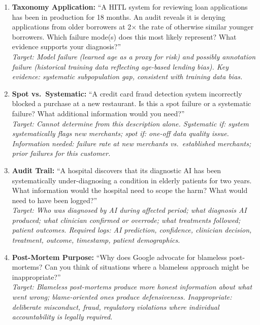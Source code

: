 \begin{enumerate}
    \item \textbf{Taxonomy Application:} ``A HITL system for reviewing loan applications has been in production for 18 months. An audit reveals it is denying applications from older borrowers at 2$\times$ the rate of otherwise similar younger borrowers. Which failure mode(s) does this most likely represent? What evidence supports your diagnosis?''\\
    \textit{Target: Model failure (learned age as a proxy for risk) and possibly annotation failure (historical training data reflecting age-based lending bias). Key evidence: systematic subpopulation gap, consistent with training data bias.}

    \item \textbf{Spot vs.\ Systematic:} ``A credit card fraud detection system incorrectly blocked a purchase at a new restaurant. Is this a spot failure or a systematic failure? What additional information would you need?''\\
    \textit{Target: Cannot determine from this description alone. Systematic if: system systematically flags new merchants; spot if: one-off data quality issue. Information needed: failure rate at new merchants vs.\ established merchants; prior failures for this customer.}

    \item \textbf{Audit Trail:} ``A hospital discovers that its diagnostic AI has been systematically under-diagnosing a condition in elderly patients for two years. What information would the hospital need to scope the harm? What would need to have been logged?''\\
    \textit{Target: Who was diagnosed by AI during affected period; what diagnosis AI produced; what clinician confirmed or overrode; what treatments followed; patient outcomes. Required logs: AI prediction, confidence, clinician decision, treatment, outcome, timestamp, patient demographics.}

    \item \textbf{Post-Mortem Purpose:} ``Why does Google advocate for blameless post-mortems? Can you think of situations where a blameless approach might be inappropriate?''\\
    \textit{Target: Blameless post-mortems produce more honest information about what went wrong; blame-oriented ones produce defensiveness. Inappropriate: deliberate misconduct, fraud, regulatory violations where individual accountability is legally required.}
\end{enumerate}

